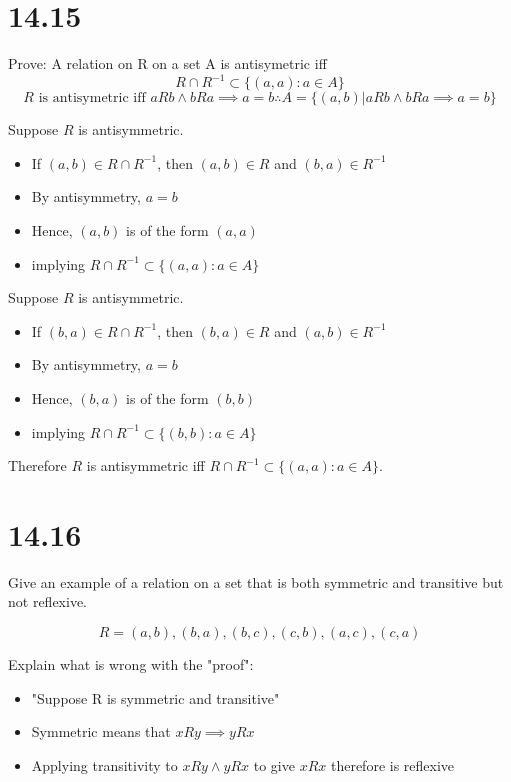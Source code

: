 \documentclass[11pt]{article}
\theoremstyle{plain}
\begin{document}
\section{14.15}
Prove: A relation on R on a set A is antisymetric iff 
$$R \cap R^{-1} \subset \{(a,a): a \in A\}$$
$$R \text{ is antisymetric iff } aRb \land bRa \implies a=b \therefore A = \{(a,b) | aRb \land bRa \implies a=b\}$$

Suppose \( R \) is antisymmetric.
\begin{itemize}
    \item If  $(a, b) \in R \cap R^{-1} $, then $ (a, b) \in R $ and $ (b, a) \in R^{-1} $ 
    \item By antisymmetry, $ a = b $
    \item Hence, $ (a, b) $ is of the form $ (a, a) $
    \item implying $ R \cap R^{-1} \subset \{(a,a): a \in A\} $
\end{itemize}


Suppose \( R \) is antisymmetric.
\begin{itemize}
    \item If  $(b, a) \in R \cap R^{-1} $, then $ (b, a) \in R $ and $ (a, b) \in R^{-1} $ 
    \item By antisymmetry, $ a = b $
    \item Hence, $ (b, a) $ is of the form $ (b, b) $
    \item implying $ R \cap R^{-1} \subset \{(b,b): a \in A\} $
\end{itemize}

Therefore \( R \) is antisymmetric iff \( R \cap R^{-1} \subset \{(a,a): a \in A\} \).

\section{14.16}
Give an example of a relation on a set that is both symmetric and transitive but not reflexive. 

$$R  = {(a,b),(b,a),(b,c),(c,b),(a,c),(c,a)}$$

Explain what is wrong with the "proof":

\begin{itemize}
    \item "Suppose R is symmetric and transitive"
    \item Symmetric means that $xRy \implies yRx$
    \item Applying transitivity to $xRy \land yRx$ to give $xRx$ therefore is reflexive
\end{itemize}
\end{document}
